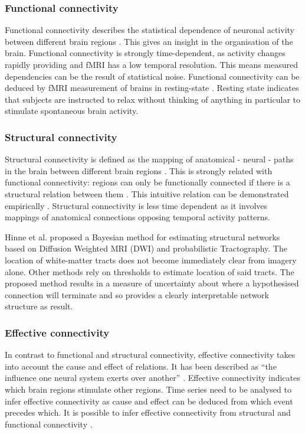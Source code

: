\documentclass[a4paper, 10pt, english, twocolumn]{article}
\begin{document}
\subsubsection*{Functional connectivity}
Functional connectivity describes the statistical dependence of neuronal activity between different brain regions \cite{friston1993functional}.
This gives an insight in the organisation of the brain.
Functional connectivity is strongly time-dependent, as activity changes rapidly providing and fMRI has a low temporal resolution.
This means measured dependencies can be the result of statistical noise.
Functional connectivity can be deduced by fMRI measurement of brains in resting-state \cite{Lowe2000, doria2010, Bullmore2009}.
Resting state indicates that subjects are instructed to relax without thinking of anything in particular to stimulate spontaneous brain activity.

\subsubsection*{Structural connectivity}
Structural connectivity is defined as the mapping of anatomical - neural - paths in the brain between different brain regions \cite{friston1994}.
This is strongly related with functional connectivity: regions can only be functionally connected if there is a structural relation between them \cite{cabral2012}.
This intuitive relation can be demonstrated empirically \cite{vandenheuvel2009}.
Structural connectivity is less time dependent as it involves mappings of anatomical connections opposing temporal activity patterns.

Hinne et al. \cite{hinne2013} proposed a Bayesian method for estimating structural networks based on Diffusion Weighted MRI (DWI) and probabilistic Tractography.
The location of white-matter tracts does not become immediately clear from imagery alone.
Other methods rely on thresholds to estimate location of said tracts.
The proposed method results in a measure of uncertainty about where a hypothesised connection will terminate and so provides a clearly interpretable network structure as result.

\subsubsection*{Effective connectivity}
In contrast to functional and structural connectivity, effective connectivity takes into account the cause and effect of relations.
It has been described as ``the influence one neural system exerts over another'' \cite{friston1994}.
Effective connectivity indicates which brain regions stimulate other regions.
Time series need to be analysed to infer effective connectivity as cause and effect can be deduced from which event precedes which. 
It is possible to infer effective connectivity from structural and functional connectivity \cite{mclntosh1994, harrison2003, friston2003, roebroeck2005}.
\end{document}
